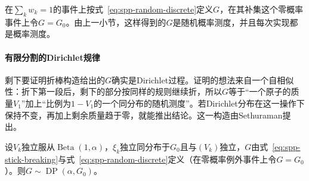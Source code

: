 在$\sum_kw_k=1$的事件上按式~\eqref{eq:spp-random-discrete}定义$G$，在其补集这个零概率事件上令$G=G_0$。由上一小节，这样得到的$G$是随机概率测度，并且每次实现都是概率测度。

\paragraph{有限分割的Dirichlet规律}
剩下要证明折棒构造给出的$G$确实是Dirichlet过程。证明的想法来自一个自相似性：折下第一段后，剩下的部分按同样的规则继续折，所以$G$等于“一个原子的质量$V_1$”加上“比例为$1-V_1$的一个同分布的随机测度”。若Dirichlet分布在这一操作下保持不变，再加上剩余质量趋于零，就能推出结论。这一构造由Sethuraman提出。

\begin{theorem}[折棒构造给出Dirichlet过程]
\label{thm:spp-stick-breaking-dp}
设$V_k$独立服从$\operatorname{Beta}(1,\alpha)$，$\xi_k$独立同分布于$G_0$且与$(V_k)$独立，$G$由式~\eqref{eq:spp-stick-breaking}与式~\eqref{eq:spp-random-discrete}定义（在零概率例外事件上令$G=G_0$）。则$G\sim\operatorname{DP}(\alpha,G_0)$。
\end{theorem}


